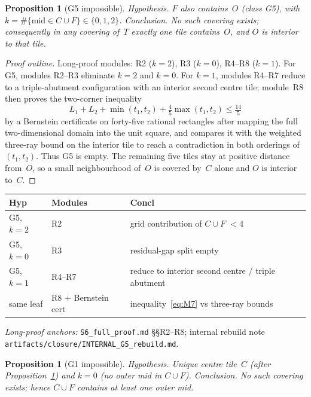 \documentclass[11pt,reqno]{amsart}
\newtheorem{proposition}[theorem]{Proposition}
\theoremstyle{definition}
\begin{document}
\begin{proposition}[G5 impossible]\label{prop:M41}
\emph{Hypothesis.} $F$ also contains~$O$ (class G5), with
$k=\#\{\mathrm{mid}\in C\cup F\}\in\{0,1,2\}$.
\emph{Conclusion.} No such covering exists; consequently in any covering of~$T$
exactly one tile contains~$O$, and $O$ is interior to that tile.
\end{proposition}

\begin{proof}[Proof outline]
Long-proof modules: R2 ($k=2$), R3 ($k=0$), R4--R8 ($k=1$).
For G5, modules R2--R3 eliminate $k=2$ and $k=0$.  For $k=1$, modules
R4--R7 reduce to a triple-abutment configuration with an interior second
centre tile; module~R8 then proves the two-corner inequality
\begin{equation}\label{eq:M7}
L_1+L_2+\min(t_1,t_2)+\tfrac45\max(t_1,t_2)\le\tfrac{14}{5}
\end{equation}
by a Bernstein certificate on forty-five rational rectangles after mapping the
full two-dimensional domain into the unit square, and compares it with the
weighted three-ray bound on the interior tile to reach a contradiction in both
orderings of $(t_1,t_2)$.  Thus G5 is empty.  The remaining five tiles stay at
positive distance from~$O$, so a small neighbourhood of~$O$ is covered by~$C$
alone and $O$ is interior to~$C$.
\end{proof}

\begin{center}
\small
\begin{tabular}{@{}llp{}@{}}
\toprule
Hyp & Modules & Concl \\
\midrule
G5, $k=2$ & R2 & grid contribution of $C\cup F$ $<4$ \\
G5, $k=0$ & R3 & residual-gap split empty \\
G5, $k=1$ & R4--R7 & reduce to interior second centre / triple abutment \\
same leaf & R8 + Bernstein cert & inequality~\eqref{eq:M7} vs three-ray bounds \\
\bottomrule
\end{tabular}
\end{center}
\smallskip
\noindent\textit{Long-proof anchors:} \texttt{S6\_full\_proof.md} §§R2--R8; internal rebuild note
\texttt{artifacts/closure/INTERNAL\_G5\_rebuild.md}.

\begin{proposition}[G1 impossible]\label{prop:M42}
\emph{Hypothesis.} Unique centre tile~$C$ (after Proposition~\ref{prop:M41}) and
$k=0$ (no outer mid in $C\cup F$).
\emph{Conclusion.} No such covering exists; hence $C\cup F$ contains at least
one outer mid.
\end{proposition}
\end{document}
